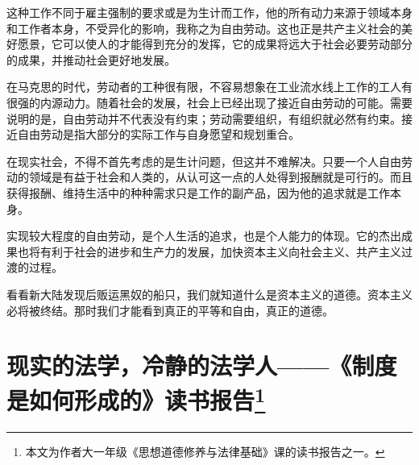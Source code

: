 \par 这种工作不同于雇主强制的要求或是为生计而工作，他的所有动力来源于领域本身和工作者本身，不受异化的影响，我称之为自由劳动。这也正是共产主义社会的美好愿景，它可以使人的才能得到充分的发挥，它的成果将远大于社会必要劳动部分的成果，并推动社会更好地发展。
\par 在马克思的时代，劳动者的工种很有限，不容易想象在工业流水线上工作的工人有很强的内源动力。随着社会的发展，社会上已经出现了接近自由劳动的可能。需要说明的是，自由劳动并不代表没有约束；劳动需要组织，有组织就必然有约束。接近自由劳动是指大部分的实际工作与自身愿望和规划重合。
\par 在现实社会，不得不首先考虑的是生计问题，但这并不难解决。只要一个人自由劳动的领域是有益于社会和人类的，从认可这一点的人处得到报酬就是可行的。而且获得报酬、维持生活中的种种需求只是工作的副产品，因为他的追求就是工作本身。
\par 实现较大程度的自由劳动，是个人生活的追求，也是个人能力的体现。它的杰出成果也将有利于社会的进步和生产力的发展，加快资本主义向社会主义、共产主义过渡的过程。
\par 看看新大陆发现后贩运黑奴的船只，我们就知道什么是资本主义的道德。资本主义必将被终结。那时我们才能看到真正的平等和自由，真正的道德。
\par {}

\section*{现实的法学，冷静的法学人——《制度是如何形成的》读书报告\footnote{本文为作者大一年级《思想道德修养与法律基础》课的读书报告之一。}}

